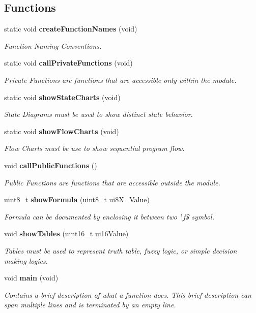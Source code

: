 \subsection*{Functions}
\begin{DoxyCompactItemize}
\item 
static void {\bf create\-Function\-Names} (void)
\begin{DoxyCompactList}\small\item\em Function Naming Conventions. \end{DoxyCompactList}\item 
static void {\bf call\-Private\-Functions} (void)
\begin{DoxyCompactList}\small\item\em Private Functions are functions that are accessible only within the module. \end{DoxyCompactList}\item 
static void {\bf show\-State\-Charts} (void)
\begin{DoxyCompactList}\small\item\em State Diagrams must be used to show distinct state behavior. \end{DoxyCompactList}\item 
static void {\bf show\-Flow\-Charts} (void)
\begin{DoxyCompactList}\small\item\em Flow Charts must be use to show sequential program flow. \end{DoxyCompactList}\item 
void {\bf call\-Public\-Functions} ()
\begin{DoxyCompactList}\small\item\em Public Functions are functions that are accessible outside the module. \end{DoxyCompactList}\item 
uint8\-\_\-t {\bf show\-Formula} (uint8\-\_\-t ui8\-X\-\_\-\-Value)
\begin{DoxyCompactList}\small\item\em Formula can be documented by enclosing it between two \textbackslash{}f\$ symbol. \end{DoxyCompactList}\item 
void {\bf show\-Tables} (uint16\-\_\-t ui16\-Value)
\begin{DoxyCompactList}\small\item\em Tables must be used to represent truth table, fuzzy logic, or simple decision making logics. \end{DoxyCompactList}\item 
void {\bf main} (void)
\begin{DoxyCompactList}\small\item\em Contains a brief description of what a function does. This brief description can span multiple lines and is terminated by an empty line. \end{DoxyCompactList}\end{DoxyCompactItemize}
